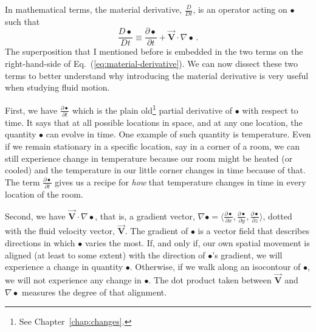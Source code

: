In mathematical terms, the material derivative, $\frac{D}{Dt}$, is an operator acting on $\bullet$ such that
\begin{equation} \label{eq:material-derivative}
\frac{D \bullet}{D t} \equiv \frac{\partial \bullet}{\partial t} + \vec{\bm{V}} \cdot \nabla \bullet \, .
\end{equation}
The superposition that I mentioned before is embedded in the two terms on the right-hand-side of Eq.~(\ref{eq:material-derivative}).
We can now dissect these two terms to better understand why introducing the material derivative is very useful when studying fluid motion.

First, we have $\frac{\partial \bullet}{\partial t}$ which is the plain old\footnote{See Chapter~\ref{chap:changes}.} partial derivative of $\bullet$ with respect to time. It says that at all possible locations in space, and at any one location, the quantity $\bullet$ can evolve in time. One example of such quantity is temperature. Even if we remain stationary in a specific location, say in a corner of a room, we can still experience change in temperature because our room might be heated (or cooled) and the temperature in our little corner changes in time because of that. The term $\frac{\partial \bullet}{\partial t}$ gives us a recipe for \textit{how} that temperature changes in time in every location of the room.

Second, we have $\vec{\bm{V}} \cdot \nabla \bullet$, that is, a gradient vector, $\nabla \bullet = \langle \frac{\partial \bullet}{\partial x}, \frac{\partial \bullet}{\partial y}, \frac{\partial \bullet}{\partial z} \rangle$, dotted with the fluid velocity vector, $\vec{\bm{V}}$. 
The gradient of $\bullet$ is a vector field that describes directions in which $\bullet$ varies the most. If, and only if, our own spatial movement is aligned (at least to some extent) with the direction of $\bullet$'s gradient, we will experience a change in quantity $\bullet$. Otherwise, if we walk along an isocontour of $\bullet$, we will not experience any change in $\bullet$. The dot product taken between $\vec{\bm{V}}$ and $\nabla \bullet$ measures the degree of that alignment.

